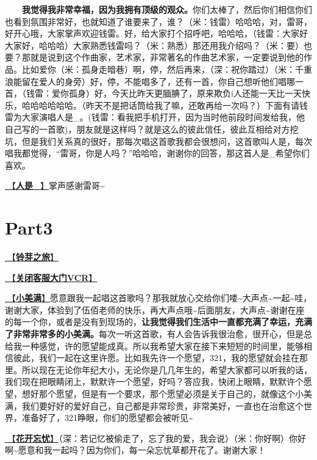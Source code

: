 \documentclass[]{ctexbook}
\begin{document}
  \textbf{我觉得我非常幸福，因为我拥有顶级的观众。}你们太棒了，然后你们相信你们也看到氛围非常好，也就知道了谁要来了，谁？（米：钱雷）哈哈哈，对，雷哥，好开心哦，大家掌声欢迎钱雷。好，给大家打个招呼吧，哈哈哈，（钱雷：大家好大家好，哈哈哈）大家熟悉钱雷吗？（米：熟悉）那还用我介绍吗？（米：要）也要？那就是说到这个作曲家，艺术家，非常著名的作曲艺术家，一定要说到他的作品。比如爱你（米：孤身走暗巷）啊，停，然后再来，（深：祝你踏过）（米：千重浪能留在爱人的身旁）好，停，不能唱多了，还有一首，你自己想听他们唱哪一首，（钱雷：爱你孤身）好，今天比昨天更腼腆了，原来欺负i人还能一天比一天快乐，哈哈哈哈哈哈。（昨天不是把话筒给我了嘛，还敢再给一次吗？）下面有请钱雷为大家演唱人是\_。(钱雷：看我把手机打开，因为当时他前段时间发给我，他自己写的一首歌)，朋友就是这样吗？就是这么的彼此信任，彼此互相给对方挖坑，但是我们关系真的很好，那每次唱这首歌我都会很想问，这首歌叫人是，每次唱我都觉得，``雷哥，你是人吗？''哈哈哈，谢谢你的回答，那这首人是\_希望你们喜欢。

\hyperref[renshi]{🎵【\textbf{人是\_}】}掌声感谢雷哥\textasciitilde{}

\section{Part3}\label{shanghai-20240519-part3}

\hyperref[travel-lingya]{🎵【\textbf{铃芽之旅}】}

\hyperref[close-door-vcr]{🎥【\textbf{关闭客服大门VCR}】}

\hyperref[happy-ending]{🎵【\textbf{小美满}】}愿意跟我一起唱这首歌吗？那我就放心交给你们喽\textasciitilde 大声点\textasciitilde 一起\textasciitilde 哇，谢谢大家，体验到了伍佰老师的快乐，再大声点哦\textasciitilde 后面朋友，大声点\textasciitilde 谢谢在座的每一个你，或者是没有到现场的，\textbf{让我觉得我们生活中一直都充满了幸运，充满了非常非常多的小美满。}每次一听这首歌，有人会告诉我很治愈，很开心，但是总给我一种感觉，许的愿望能成真。所以我希望大家在接下来短短的时间里，能够相信彼此，我们一起在这里许愿。比如我先许一个愿望，321，我的愿望就会挂在那里。所以现在无论你年纪大小，无论你是几几年生的，希望大家都可以听我的话，我们现在把眼睛闭上，默默许一个愿望，好吗？答应我，快闭上眼睛，默默许个愿望，想好那个愿望，但是有一个要求，那个愿望必须是关于自己的，就像这个小美满，我们要好好的爱好自己，自己都是非常珍贵，非常美好，一直也在治愈这个世界，准备好了，321睁眼，你们的愿望都会被听见\textasciitilde{}

\hyperref[no-worries]{🎵【\textbf{花开忘忧}】}（深：若记忆被偷走了，忘了我的爱，我会说）（米：你好啊）你好啊\textasciitilde 愿意和我一起吗？因为你们，每一朵忘忧草都开花了。谢谢大家！
\end{document}
